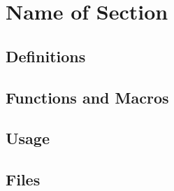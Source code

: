 \documentclass[a4paper]{article}
\begin{document}
\section{Name of Section}

\subsection{Definitions}


\subsection{Functions and Macros}

\subsection{Usage}

\subsection{Files}
\end{document}
